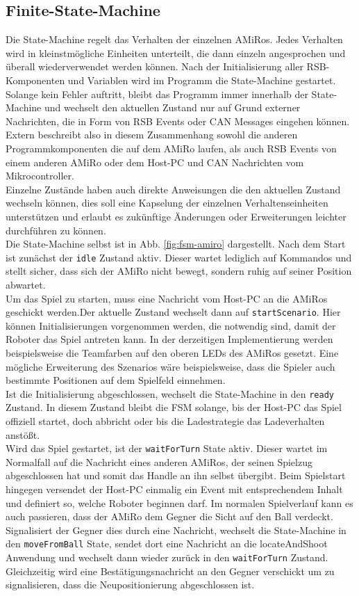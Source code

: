 \subsection{Finite-State-Machine} %
Die State-Machine regelt das Verhalten der einzelnen AMiRos. Jedes Verhalten wird in kleinstmögliche Einheiten unterteilt, die dann einzeln angesprochen und überall wiederverwendet werden können. Nach der Initialisierung aller RSB-Komponenten und Variablen wird im Programm die State-Machine gestartet.\\ 
Solange kein Fehler auftritt, bleibt das Programm immer innerhalb der State-Machine und wechselt den aktuellen Zustand nur auf Grund externer Nachrichten, die in Form von RSB Events oder CAN Messages eingehen können. Extern beschreibt also in diesem Zusammenhang sowohl die anderen Programmkomponenten die auf dem AMiRo laufen, als auch RSB Events von einem anderen AMiRo oder dem Host-PC und CAN Nachrichten vom Mikrocontroller.\\
Einzelne Zustände haben auch direkte Anweisungen die den aktuellen Zustand wechseln können, dies soll eine Kapselung der einzelnen Verhaltenseinheiten unterstützen und erlaubt es zukünftige Änderungen oder Erweiterungen leichter durchführen zu können.\\
Die State-Machine selbst ist in Abb. \ref{fig:fsm-amiro} dargestellt. Nach dem Start ist zunächst der \texttt{idle} Zustand aktiv. Dieser wartet lediglich auf Kommandos und stellt sicher, dass sich der AMiRo nicht bewegt, sondern ruhig auf seiner Position abwartet.\\
Um das Spiel zu starten, muss eine Nachricht vom Host-PC an die AMiRos geschickt werden.Der aktuelle Zustand wechselt dann auf \texttt{startScenario}. Hier können Initialisierungen vorgenommen werden, die notwendig sind, damit der Roboter das Spiel antreten kann. In der derzeitigen Implementierung werden beispielsweise die Teamfarben auf den oberen LEDs des AMiRos gesetzt. Eine mögliche Erweiterung des Szenarios wäre beispielsweise, dass die Spieler auch bestimmte Positionen auf dem Spielfeld einnehmen.\\
Ist die Initialisierung abgeschlossen, wechselt die State-Machine in den \texttt{ready} Zustand. In diesem Zustand bleibt die FSM solange, bis der Host-PC das Spiel offiziell startet, doch abbricht oder bis die Ladestrategie das Ladeverhalten anstößt.\\
Wird das Spiel gestartet, ist der \texttt{waitForTurn} State aktiv. Dieser wartet im Normalfall auf die Nachricht eines anderen AMiRos, der seinen Spielzug abgeschlossen hat und somit das Handle an ihn selbst übergibt. Beim Spielstart hingegen versendet der Host-PC einmalig ein Event mit entsprechendem Inhalt und definiert so, welche Roboter beginnen darf. Im normalen Spielverlauf kann es auch passieren, dass der AMiRo dem Gegner die Sicht auf den Ball verdeckt. Signalisiert der Gegner dies durch eine Nachricht, wechselt die State-Machine in den \texttt{moveFromBall} State, sendet dort eine Nachricht an die locateAndShoot Anwendung und wechselt dann wieder zurück in den \texttt{waitForTurn} Zustand. Gleichzeitig wird eine Bestätigungsnachricht an den Gegner verschickt um zu signalisieren, dass die Neupositionierung abgeschlossen ist.\\
